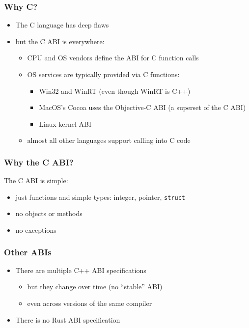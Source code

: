 \documentclass[12pt]{article}
\begin{document}
\subsubsection{Why C?}
\begin{itemize}
    \item The C language has deep flaws
    \item but the C ABI is everywhere:
    \begin{itemize}
        \item CPU and OS vendors define the ABI for C function calls
        \item OS services are typically provided via C functions:
        \begin{itemize}
            \item Win32 and WinRT (even though WinRT is C++)
            \item MacOS's Cocoa uses the Objective-C ABI (a superset of the C ABI)
            \item Linux kernel ABI
        \end{itemize}
        \item almost all other languages support calling into C code
    \end{itemize}
\end{itemize}

\subsubsection{Why the C ABI?}
The C ABI is simple:
\begin{itemize}
    \item just functions and simple types: integer, pointer, \texttt{struct}
    \item no objects or methods
    \item no exceptions
\end{itemize}



\subsubsection{Other ABIs}

\begin{itemize}
    \item There are multiple C++ ABI specifications
    \begin{itemize}
        \item but they change over time (no ``stable'' ABI)
        \item even across versions of the same compiler
    \end{itemize}
    \item There is no Rust ABI specification
\end{itemize}
\end{document}
